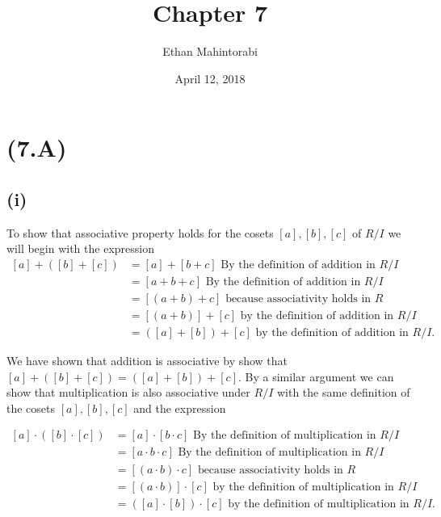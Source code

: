 \documentclass{article}
\begin{document}
  
  \title{Chapter 7}
  \author{Ethan Mahintorabi}
  \date{April 12, 2018}
  
  \maketitle
  \section*{(7.A)}
    \subsection*{(i)}
      To show that associative property holds for the cosets $[a], [b], [c]$ of $R/I$ we will begin with the expression
      \[
        \begin{split}
          [a] + ([b] + [c]) &= [a] + [b+c] \text{ By the definition of addition in } R/I\\
          &= [a+b+c] \text{ By the definition of addition in } R/I\\
          &= [(a+b) + c] \text{ because associativity holds in } R\\
          &= [(a+b)] + [c] \text{ by the definition of addition in } R/I\\
          &= ([a] + [b]) + [c] \text{ by the definition of addition in } R/I.
        \end{split}
      \]

      We have shown that addition is associative by show that $[a] + ([b] + [c]) = ([a] + [b]) + [c]$. By a similar argument we can show that multiplication is also associative under $R/I$ with the same definition of the cosets $[a],[b],[c]$ and the expression
      
      \[
        \begin{split}
          [a] \cdot ([b] \cdot [c]) &= [a] \cdot [b \cdot c] \text{ By the definition of multiplication in } R/I\\
          &= [a \cdot b \cdot c] \text{ By the definition of multiplication in } R/I\\
          &= [(a \cdot b) \cdot c] \text{ because associativity holds in } R\\
          &= [(a \cdot b)] \cdot [c] \text{ by the definition of multiplication in } R/I\\
          &= ([a] \cdot [b]) \cdot [c] \text{ by the definition of multiplication in } R/I.
        \end{split}
      \]
\end{document}
